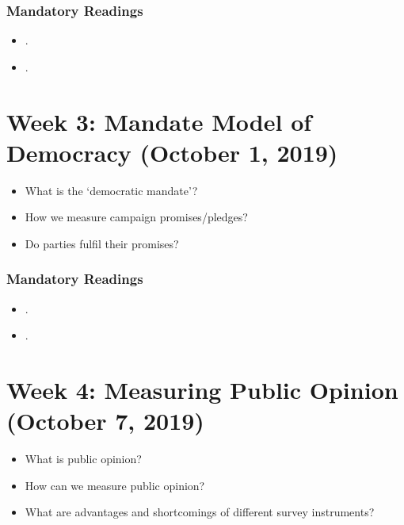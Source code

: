 \documentclass[abstract=on,parskip=full,headings=standardclasses,fontsize=11pt,paper=a4]{scrartcl}
\begin{document}
\subsubsection*{Mandatory Readings}
\begin{itemize}
\item {}.
\item {}.
\end{itemize}



\section{Week 3:  Mandate Model of Democracy (October 1, 2019)}



\begin{itemize}
\renewcommand\labelitemi{--}
\item What is the `democratic mandate'? 
\item How we measure campaign promises/pledges?
\item Do parties fulfil their promises?
\end{itemize}

\subsubsection*{Mandatory Readings}
\begin{itemize}
\item {}.
\item {}.
\end{itemize}


\section{Week 4: Measuring Public Opinion (October 7, 2019)}


\begin{itemize}
\renewcommand\labelitemi{--}
\item What is public opinion?
\item How can we measure public opinion? 
\item What are advantages and shortcomings of different survey instruments?
\end{itemize}
\end{document}
